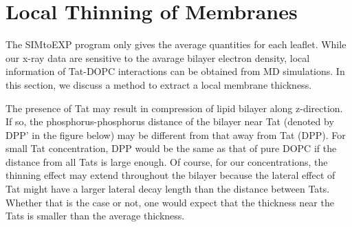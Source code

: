 \documentclass[12pt,letterpaper]{article}
\begin{document}
\section{Local Thinning of Membranes}
The SIMtoEXP program only gives the average quantities for each leaflet. 
While our x-ray data are sensitive to the avarage bilayer electron density,
local information of Tat-DOPC interactions can be obtained from MD simulations.
In this section, we discuss a method to extract a local membrane thickness.

The presence of Tat may result in compression of lipid bilayer along z-direction. 
If so, the phosphorus-phosphorus distance of the bilayer near Tat (denoted by DPP'
in the figure below) may be different from that away from Tat (DPP).  For 
small Tat concentration, DPP would be the same as that of pure DOPC if the 
distance from all Tats is large enough.  Of course, for our concentrations, 
the thinning effect may extend throughout the bilayer because the lateral
effect of Tat might have a larger lateral decay length than the distance 
between Tats.  Whether that is the case or not, one would expect that the 
thickness near the Tats is smaller than the average thickness.
\end{document}
